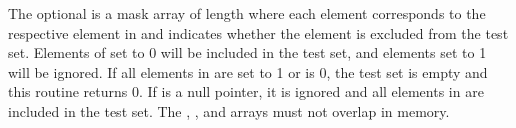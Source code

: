 \begin{apidefinition}
{    The optional  is a mask array of length  where each element
    corresponds to the respective element in  and indicates whether
    the element is excluded from the test set.  Elements of  set to
    0 will be included in the test set, and elements set to 1 will be ignored.  If all elements
    in  are set to 1 or  is 0, the test set is empty
    and this routine returns 0.  If  is a null pointer, it is
    ignored and all elements in  are included in the test set.  The
    , , and  arrays must not overlap in
    memory.
}



\end{apidefinition}
